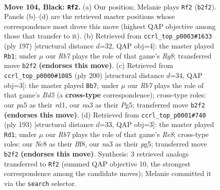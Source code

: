 \documentclass[11pt]{article}
\begin{document}
\clearpage

\begin{figure}[p]\centering
\begin{subfigure}{0.46\textwidth}\centering
\resizebox{\linewidth}{!}{%
\newchessgame
\chessboard[
  setfen={2n5/5k1K/p7/P4p1p/5B2/N5P1/1r4b1/R7 b - - 19 104},
  showmover=false,
  pgfstyle=straightmove, color=movearrow, markmove={b2-f2}
]}
\caption{}
\end{subfigure}\hfill
\begin{subfigure}{0.46\textwidth}\centering
\resizebox{\linewidth}{!}{%
\newchessgame
\chessboard[
  setfen={8/p7/PpB5/1P2kb2/2P5/K7/3R4/6r1 b - - 42 99},
  showmover=false,
  pgfstyle=straightmove, color=movearrow, markmove={g1-b1}
]}
\caption{}
\end{subfigure}
\\[4pt]
\begin{subfigure}{0.46\textwidth}\centering
\resizebox{\linewidth}{!}{%
\newchessgame
\chessboard[
  setfen={7k/4R3/p5p1/PbKB2P1/8/8/8/3r4 w - - 56 101},
  showmover=false,
  pgfstyle=straightmove, color=movearrow, markmove={d5-b7}
]}
\caption{}
\end{subfigure}\hfill
\begin{subfigure}{0.46\textwidth}\centering
\resizebox{\linewidth}{!}{%
\newchessgame
\chessboard[
  setfen={5bk1/5p2/5P2/p2K2PR/P2N4/8/8/4r3 b - - 15 97},
  showmover=false,
  pgfstyle=straightmove, color=movearrow, markmove={e1-d1}
]}
\caption{}
\end{subfigure}
\caption{\textbf{Move 104, Black: \texttt{Rf2}.} (a) Our position; Melanie plays \texttt{Rf2} (\texttt{b2f2}). Panels (b)--(d) are the retrieved master positions whose correspondence most drove this move (highest QAP objective among those that transfer to it). (b) Retrieved from \texttt{ccrl\_top\_p0003\#1633} (ply 197) [structural distance $d$=32, QAP obj=4]: the master played \texttt{Rb1}; under $\mu$ our \emph{Rb7} plays the role of that game's \emph{Rg8}; transferred move \texttt{b2f2} \textbf{(endorses this move)}. (c) Retrieved from \texttt{ccrl\_top\_p0000\#1085} (ply 200) [structural distance $d$=34, QAP obj=3]: the master played \texttt{Bb7}; under $\mu$ our \emph{Rb7} plays the role of that game's \emph{Bd5} (a \textbf{cross-type} correspondence); cross-type roles: our \emph{p}a5 as their \emph{r}d1, our \emph{n}a3 as their \emph{P}g5; transferred move \texttt{b2f2} \textbf{(endorses this move)}. (d) Retrieved from \texttt{ccrl\_top\_p0001\#740} (ply 193) [structural distance $d$=33, QAP obj=3]: the master played \texttt{Rd1}; under $\mu$ our \emph{Rb7} plays the role of that game's \emph{Re8}; cross-type roles: our \emph{N}c8 as their \emph{B}f8, our \emph{n}a3 as their \emph{p}g5; transferred move \texttt{b2f2} \textbf{(endorses this move)}. Synthesis: 3 retrieved analogs transferred to \texttt{Rf2} (summed QAP objective 10, the strongest correspondence among the candidate moves); Melanie committed it via the \texttt{search} selector.}
\label{fig:thought-m207}
\end{figure}
\end{document}
